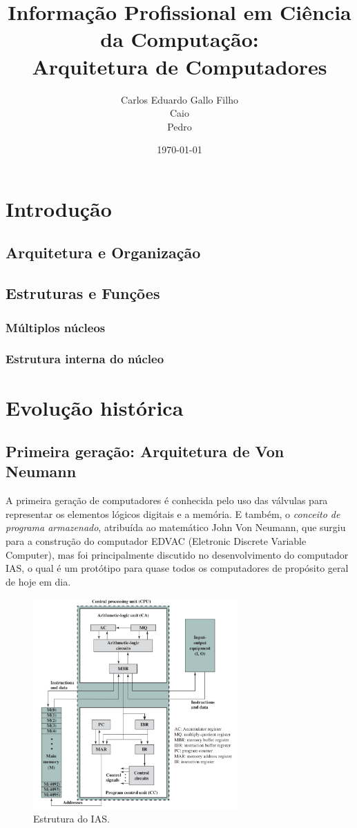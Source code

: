 \documentclass{article}
\title{Informação Profissional em Ciência da Computação:\\
  Arquitetura de Computadores}
\author{Carlos Eduardo Gallo Filho \\
  Caio \\
  Pedro}
\date{\today}
\begin{document}
\maketitle

\section{Introdução}
\subsection{Arquitetura e Organização}
\subsection{Estruturas e Funções}
\subsubsection{Múltiplos núcleos}
\subsubsection{Estrutura interna do núcleo}

\section{Evolução histórica}
\subsection{Primeira geração: Arquitetura de Von Neumann}
A primeira geração de computadores é conhecida pelo uso das válvulas para
representar os elementos lógicos digitais e a memória. E também, o
\textit{conceito de programa armazenado}, atribuída ao matemático John Von
Neumann, que surgiu para a construção do computador EDVAC (Eletronic Discrete
Variable Computer), mas foi principalmente discutido no desenvolvimento do
computador IAS, o qual é um protótipo para quase todos os computadores de
propósito geral de hoje em dia.

\begin{figure}[h]
  \centering
  \includegraphics[width=0.7\textwidth]{ias.png}
  \caption{Estrutura do IAS.}
\end{figure}
\end{document}

